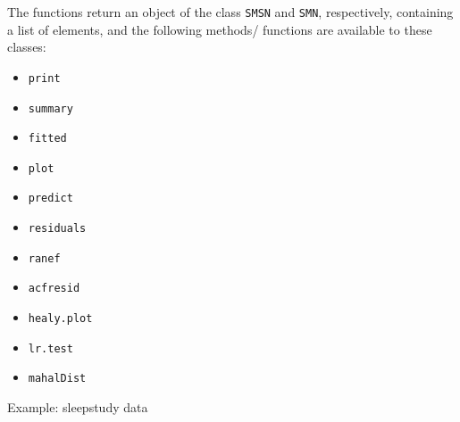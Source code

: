 \begin{frame}[fragile]

The functions return an object of the class \texttt{SMSN} and
\texttt{SMN}, respectively, containing a list of elements, and the
following methods/ functions are available to these classes:

\begin{multicols}{2}
\begin{itemize}
\item
  \texttt{print}
\item
  \texttt{summary}
\item
  \texttt{fitted}
\item
  \texttt{plot}
\item
  \texttt{predict}
\item
  \texttt{residuals}
\item
  \texttt{ranef}
\item
  \texttt{acfresid}
\item
  \texttt{healy.plot}
\item
  \texttt{lr.test}
\item
  \texttt{mahalDist} 
\end{itemize}
\end{multicols}

\end{frame}
\begin{frame}[fragile]{Example: sleepstudy data}
\protect\hypertarget{example-sleepstudy-data}{}

\scriptsize

\begin{Shaded}
\begin{Highlighting}[]
\NormalTok{(}\OperatorTok{~}
               \OperatorTok{~} \NormalTok{,}
\end{Highlighting}
\end{Shaded}


\begin{Shaded}
\begin{Highlighting}[]
\NormalTok{(}\OperatorTok{~}
               \OperatorTok{~} \NormalTok{,}
\end{Highlighting}
\end{Shaded}

\end{frame}

